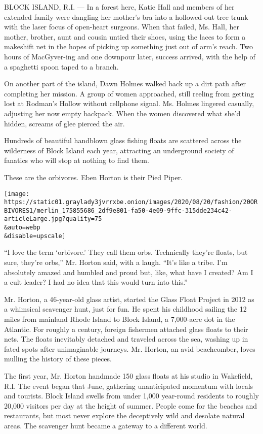 BLOCK ISLAND, R.I. --- In a forest here, Katie Hall and members of her
extended family were dangling her mother's bra into a hollowed-out tree
trunk with the laser focus of open-heart surgeons. When that failed, Ms.
Hall, her mother, brother, aunt and cousin untied their shoes, using the
laces to form a makeshift net in the hopes of picking up something just
out of arm's reach. Two hours of MacGyver-ing and one downpour later,
success arrived, with the help of a spaghetti spoon taped to a branch.

On another part of the island, Dawn Holmes walked back up a dirt path
after completing her mission. A group of women approached, still reeling
from getting lost at Rodman's Hollow without cellphone signal. Ms.
Holmes lingered casually, adjusting her now empty backpack. When the
women discovered what she'd hidden, screams of glee pierced the air.

Hundreds of beautiful handblown glass fishing floats are scattered
across the wilderness of Block Island each year, attracting an
underground society of fanatics who will stop at nothing to find them.

These are the orbivores. Eben Horton is their Pied Piper.

\texttt{[image: https://static01.graylady3jvrrxbe.onion/images/2020/08/20/fashion/20ORBIVORES1/merlin\_175855686\_2df9e801-fa50-4e09-9ffc-315dde234c42-articleLarge.jpg?quality=75\\\&auto=webp\\\&disable=upscale]}

``I love the term `orbivore.' They call them orbs. Technically they're
floats, but sure, they're orbs,'' Mr. Horton said, with a laugh. ``It's
like a tribe. I'm absolutely amazed and humbled and proud but, like,
what have I created? Am I a cult leader? I had no idea that this would
turn into this.''

Mr. Horton, a 46-year-old glass artist, started the Glass Float Project
in 2012 as a whimsical scavenger hunt, just for fun. He spent his
childhood sailing the 12 miles from mainland Rhode Island to Block
Island, a 7,000-acre dot in the Atlantic. For roughly a century, foreign
fishermen attached glass floats to their nets. The floats inevitably
detached and traveled across the sea, washing up in fated spots after
unimaginable journeys. Mr. Horton, an avid beachcomber, loves mulling
the history of these pieces.

The first year, Mr. Horton handmade 150 glass floats at his studio in
Wakefield, R.I. The event began that June, gathering unanticipated
momentum with locals and tourists. Block Island swells from under 1,000
year-round residents to roughly 20,000 visitors per day at the height of
summer. People come for the beaches and restaurants, but most never
explore the deceptively wild and desolate natural areas. The scavenger
hunt became a gateway to a different world.

